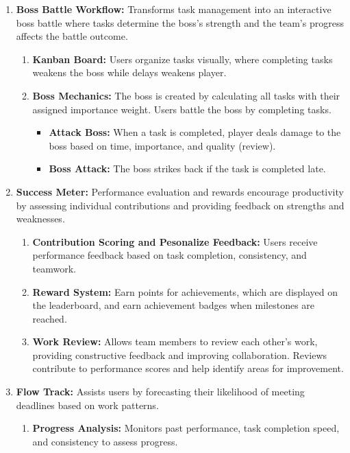 \begin{enumerate}[leftmargin=80pt]  
    \item \textbf{Boss Battle Workflow:} Transforms task management into an interactive boss battle where tasks determine the boss’s strength and the team's progress affects the battle outcome.  
    \begin{enumerate}  
        \item \textbf{Kanban Board:} Users organize tasks visually, where completing tasks weakens the boss while delays weakens player.  
        \item \textbf{Boss Mechanics:} The boss is created by calculating all tasks with their assigned importance weight. Users battle the boss by completing tasks.
        \begin{itemize}
            \item \textbf{Attack Boss:} When a task is completed, player deals damage to the boss based on time, importance, and quality (review).
            \item \textbf{Boss Attack:} The boss strikes back if the task is completed late.
        \end{itemize}
    \end{enumerate}  

    \item \textbf{Success Meter:} Performance evaluation and rewards encourage productivity by assessing individual contributions and providing feedback on strengths and weaknesses.  
    \begin{enumerate}  
        \item \textbf{Contribution Scoring and Pesonalize Feedback:} Users receive performance feedback based on task completion, consistency, and teamwork.  
        \item \textbf{Reward System:} Earn points for achievements, which are displayed on the leaderboard, and earn achievement badges when milestones are reached.  
        \item \textbf{Work Review:} Allows team members to review each other’s work, providing constructive feedback and improving collaboration. Reviews contribute to performance scores and help identify areas for improvement.  
    \end{enumerate}  

    \item \textbf{Flow Track:} Assists users by forecasting their likelihood of meeting deadlines based on work patterns.  
    \begin{enumerate}  
        \item \textbf{Progress Analysis:} Monitors past performance, task completion speed, and consistency to assess progress.  
    \end{enumerate}  
\end{enumerate}  


